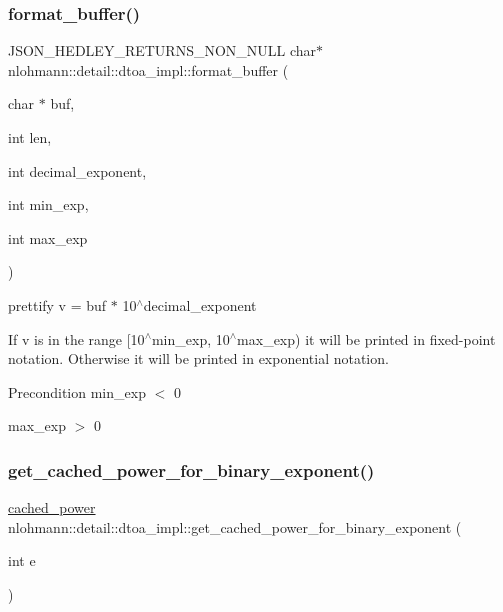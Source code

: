 \subsubsection{\texorpdfstring{format\+\_\+buffer()}{format\_buffer()}}
{\footnotesize\ttfamily J\+S\+O\+N\+\_\+\+H\+E\+D\+L\+E\+Y\+\_\+\+R\+E\+T\+U\+R\+N\+S\+\_\+\+N\+O\+N\+\_\+\+N\+U\+LL char$\ast$ nlohmann\+::detail\+::dtoa\+\_\+impl\+::format\+\_\+buffer (\begin{DoxyParamCaption}\item[{char $\ast$}]{buf,  }\item[{int}]{len,  }\item[{int}]{decimal\+\_\+exponent,  }\item[{int}]{min\+\_\+exp,  }\item[{int}]{max\+\_\+exp }\end{DoxyParamCaption})\hspace{0.3cm}{\ttfamily [inline]}}



prettify v = buf $\ast$ 10$^\wedge$decimal\+\_\+exponent 

If v is in the range \mbox{[}10$^\wedge$min\+\_\+exp, 10$^\wedge$max\+\_\+exp) it will be printed in fixed-\/point notation. Otherwise it will be printed in exponential notation.

\begin{DoxyPrecond}{Precondition}
min\+\_\+exp $<$ 0 

max\+\_\+exp $>$ 0 
\end{DoxyPrecond}
\mbox{\label{namespacenlohmann_1_1detail_1_1dtoa__impl_adbf329a18c5cf854a3477327afd2200b}} 
\subsubsection{\texorpdfstring{get\+\_\+cached\+\_\+power\+\_\+for\+\_\+binary\+\_\+exponent()}{get\_cached\_power\_for\_binary\_exponent()}}
{\footnotesize\ttfamily \hyperlink{structnlohmann_1_1detail_1_1dtoa__impl_1_1cached__power}{cached\+\_\+power} nlohmann\+::detail\+::dtoa\+\_\+impl\+::get\+\_\+cached\+\_\+power\+\_\+for\+\_\+binary\+\_\+exponent (\begin{DoxyParamCaption}\item[{int}]{e }\end{DoxyParamCaption})\hspace{0.3cm}{\ttfamily [inline]}}

